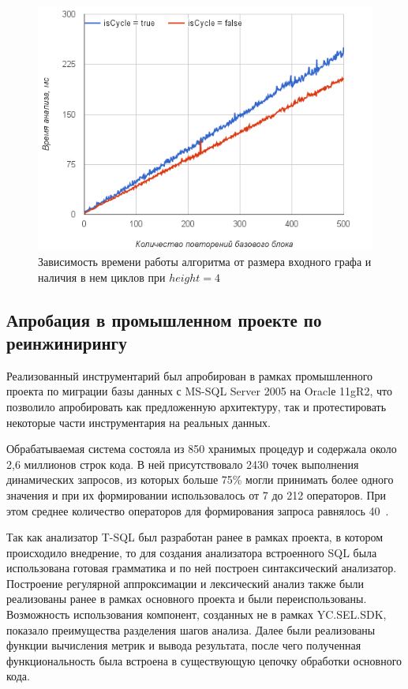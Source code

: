 \begin{figure}[h!]
 \centering
 \includegraphics[width=15cm]{pics/heigh4.png}
 \caption{Зависимость времени работы алгоритма от размера входного графа и наличия в нем циклов при $height=4$}
 \label{CycleVsLinear}
\end{figure}


\subsection{Апробация в промышленном проекте по реинжинирингу}

Реализованный инструментарий был апробирован в рамках промышленного проекта по миграции базы данных с MS-SQL Server 2005 на Oraclе 11gR2, что позволило апробировать как предложенную архитектуру, так и протестировать некоторые части инструментария на реальных данных.

Обрабатываемая система состояла из 850 хранимых процедур и содержала около 2,6 миллионов строк кода. В ней присутствовало 2430 точек выполнения динамических запросов, из которых больше 75\% могли принимать более одного значения и при их формировании использовалось от 7 до 212 операторов. При этом среднее количество операторов для формирования запроса равнялось 40~\cite{Syrcose}.

Так как анализатор T-SQL был разработан ранее в рамках проекта, в котором происходило внедрение, то для создания анализатора встроенного SQL была использована готовая грамматика и по ней построен синтаксический анализатор. Построение регулярной аппроксимации и лексический анализ также были реализованы ранее в рамках основного проекта и были переиспользованы. 
Возможность использования компонент, созданных не в рамках YC.SEL.SDK, показало преимущества разделения шагов анализа. 
Далее были реализованы функции вычисления метрик и вывода результата, после чего полученная функциональность была встроена в существующую цепочку обработки основного кода. 

